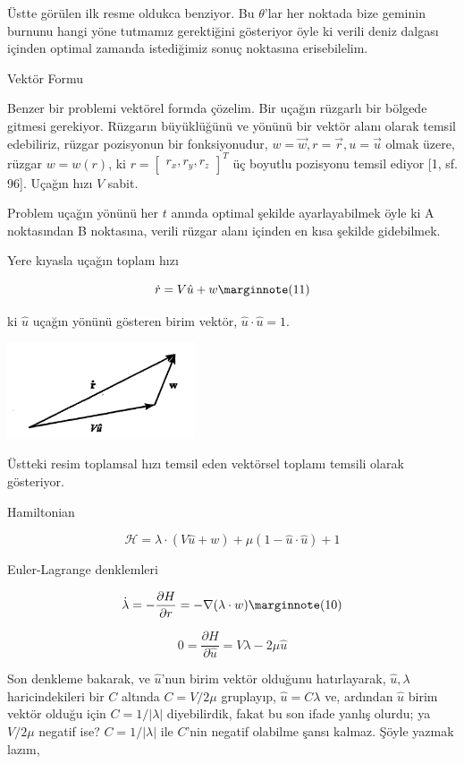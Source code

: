 \documentclass[12pt,fleqn]{article}\usepackage{../../common}
\begin{document}
Üstte görülen ilk resme oldukca benziyor. Bu $\theta$'lar her noktada bize
geminin burnunu hangi yöne tutmamız gerektiğini gösteriyor öyle ki
verili deniz dalgası içinden optimal zamanda istediğimiz sonuç noktasına
erisebilelim. 

Vektör Formu

Benzer bir problemi vektörel formda çözelim. Bir uçağın rüzgarlı bir
bölgede gitmesi gerekiyor. Rüzgarın büyüklüğünü ve yönünü bir vektör
alanı olarak temsil edebiliriz, rüzgar pozisyonun bir fonksiyonudur,
$w = \vec{w}, r = \vec{r}, u = \vec{u}$ olmak üzere, rüzgar $w =
w(r)$, ki $r = \left[\begin{array}{ccc} r_x, r_y, r_z\end{array}\right]^T$ 
üç boyutlu pozisyonu temsil ediyor [1, sf. 96]. Uçağın hızı $V$
sabit. 

Problem uçağın yönünü her $t$ anında optimal şekilde ayarlayabilmek
öyle ki A noktasından B noktasına, verili rüzgar alanı içinden en kısa
şekilde gidebilmek. 

Yere kıyasla uçağın toplam hızı 

$$
\dot{r} = V \hat{u} + w
\mlabel{11}
$$

ki $\hat{u}$ uçağın yönünü gösteren birim vektör, $\hat{u} \cdot
\hat{u} = 1$. 

\includegraphics[width=15em]{phy_path_03.png}

Üstteki resim toplamsal hızı temsil eden vektörsel toplamı temsili
olarak gösteriyor. 

Hamiltonian 

$$
\mathcal{H} = \lambda \cdot (V \hat{u}  + w) + 
\mu (1 - \hat{u}\cdot\hat{u}) + 1
$$

Euler-Lagrange denklemleri 

$$
\dot{\lambda} = - \frac{\partial H}{\partial r} = - \nabla (\lambda \cdot w)
\mlabel{10}
$$

$$
0 = \frac{\partial H}{\partial \hat{u}} = V \lambda - 2\mu\hat{u}
$$

Son denkleme bakarak, ve $\hat{u}$'nun birim vektör olduğunu hatırlayarak,
$\hat{u},\lambda$ haricindekileri bir $C$ altında $C =V/2\mu$ gruplayıp,
$\hat{u} = C \lambda$ ve, ardından $\hat{u}$ birim vektör olduğu için
$C = 1/|\lambda|$ diyebilirdik, fakat bu son ifade yanlış olurdu; ya
$V/2\mu$ negatif ise? $C = 1/|\lambda|$ ile $C$'nin negatif olabilme şansı
kalmaz. Şöyle yazmak lazım,
\end{document}
